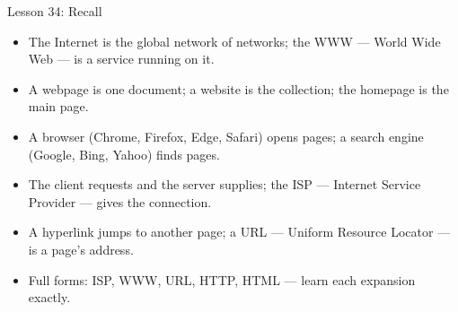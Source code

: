 \documentclass[aspectratio=169]{beamer}
\begin{document}
\begin{frame}{Lesson 34: Recall}
  \begin{itemize}
    \item The Internet is the global network of networks; the WWW --- World
      Wide Web --- is a service running on it.
    \item A webpage is one document; a website is the collection; the
      homepage is the main page.
    \item A browser (Chrome, Firefox, Edge, Safari) opens pages; a search
      engine (Google, Bing, Yahoo) finds pages.
    \item The client requests and the server supplies; the ISP --- Internet
      Service Provider --- gives the connection.
    \item A hyperlink jumps to another page; a URL --- Uniform Resource
      Locator --- is a page's address.
    \item Full forms: ISP, WWW, URL, HTTP, HTML --- learn each expansion
      exactly.
  \end{itemize}
\end{frame}
\end{document}
